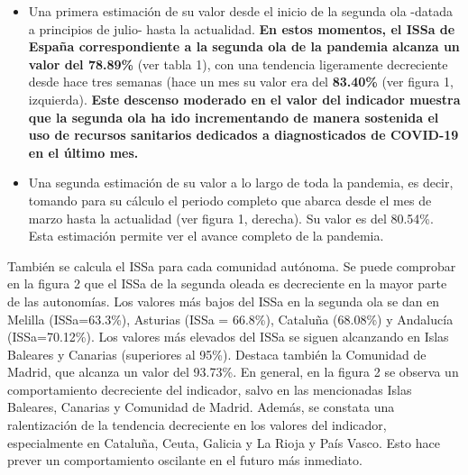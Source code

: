\documentclass[
  11pt,
]{article}
\begin{document}
\begin{itemize}
\item
  Una primera estimación de su valor desde el inicio de la segunda ola
  -datada a principios de julio- hasta la actualidad. \textbf{En estos
  momentos, el ISSa de España correspondiente a la segunda ola de la
  pandemia alcanza un valor del 78.89\%} (ver tabla 1), con una
  tendencia ligeramente decreciente desde hace tres semanas (hace un mes
  su valor era del \textbf{83.40\%} (ver figura 1, izquierda).
  \textbf{Este descenso moderado en el valor del indicador muestra que
  la segunda ola ha ido incrementando de manera sostenida el uso de
  recursos sanitarios dedicados a diagnosticados de COVID-19 en el
  último mes.}
\item
  Una segunda estimación de su valor a lo largo de toda la pandemia, es
  decir, tomando para su cálculo el periodo completo que abarca desde el
  mes de marzo hasta la actualidad (ver figura 1, derecha). Su valor es
  del 80.54\%. Esta estimación permite ver el avance completo de la
  pandemia.
\end{itemize}

También se calcula el ISSa para cada comunidad autónoma. Se puede
comprobar en la figura 2 que el ISSa de la segunda oleada es decreciente
en la mayor parte de las autonomías. Los valores más bajos del ISSa en
la segunda ola se dan en Melilla (ISSa=63.3\%), Asturias (ISSa =
66.8\%), Cataluña (68.08\%) y Andalucía (ISSa=70.12\%). Los valores más
elevados del ISSa se siguen alcanzando en Islas Baleares y Canarias
(superiores al 95\%). Destaca también la Comunidad de Madrid, que
alcanza un valor del 93.73\%. En general, en la figura 2 se observa un
comportamiento decreciente del indicador, salvo en las mencionadas Islas
Baleares, Canarias y Comunidad de Madrid. Además, se constata una
ralentización de la tendencia decreciente en los valores del indicador,
especialmente en Cataluña, Ceuta, Galicia y La Rioja y País Vasco. Esto
hace prever un comportamiento oscilante en el futuro más inmediato.
\end{document}
